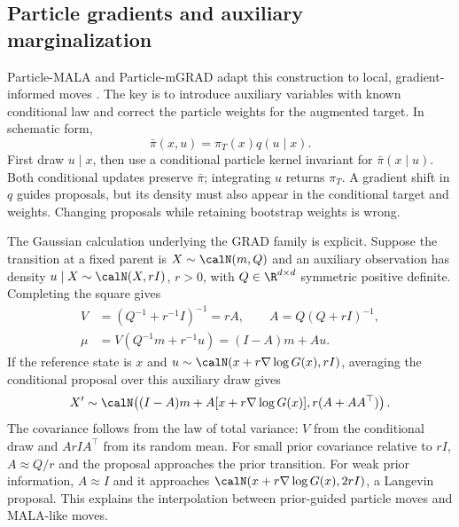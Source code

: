 \subsection{Particle gradients and auxiliary marginalization}

Particle-MALA and Particle-mGRAD adapt this construction to local,
gradient-informed moves \citep[Algorithms 3--7]{corenflos2024particlemala}.
The key is to introduce auxiliary variables with known conditional law and
correct the particle weights for the augmented target. In schematic form,
\begin{equation}
 \bar\pi(x,u)=\pi_T(x)q(u\mid x).
 \label{eq:bf-modern-particle-auxiliary}
\end{equation}
First draw $u\mid x$, then use a conditional particle kernel invariant for
$\bar\pi(x\mid u)$. Both conditional updates preserve $\bar\pi$;
integrating $u$ returns $\pi_T$. A gradient shift in $q$ guides proposals,
but its density must also appear in the conditional target and weights.
Changing proposals while retaining bootstrap weights is wrong.

The Gaussian calculation underlying the GRAD family is explicit. Suppose
the transition at a fixed parent is $X\sim\calN(m,Q)$ and an auxiliary
observation has density $u\mid X\sim\calN(X,rI)$, $r>0$, with
$Q\in\R^{d\times d}$ symmetric positive definite. Completing the
square gives
\begin{align}
 V&=(Q^{-1}+r^{-1}I)^{-1}=rA,\qquad A=Q(Q+rI)^{-1},\\
 \mu&=V(Q^{-1}m+r^{-1}u)=(I-A)m+Au.
 \label{eq:bf-modern-grad-gaussian-product}
\end{align}
If the reference state is $x$ and
$u\sim\calN(x+r\nabla\log G(x),rI)$, averaging the conditional proposal
over this auxiliary draw gives
\begin{equation}
 X'\sim\calN\!\left((I-A)m+A[x+r\nabla\log G(x)],
                            r(A+AA^\top)\right).
 \label{eq:bf-modern-grad-marginal-proposal}
\end{equation}
The covariance follows from the law of total variance: $V$ from the
conditional draw and $ArIA^\top$ from its random mean. For small prior
covariance relative to $rI$, $A\approx Q/r$ and the proposal approaches the
prior transition. For weak prior information, $A\approx I$ and it approaches
$\calN(x+r\nabla\log G(x),2rI)$, a Langevin proposal. This explains the
interpolation between prior-guided particle moves and MALA-like moves.

